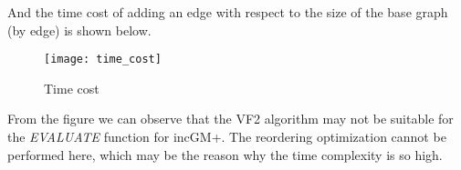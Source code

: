 \documentclass[a4paper, 12pt]{report}
\begin{document}
And the time cost of adding an edge with respect to the size of the base graph (by edge) is shown below.

\begin{figure}[H]
\centering
\texttt{[image: time\_cost]}
\caption{Time cost}
\end{figure}

From the figure we can observe that the VF2 algorithm may not be suitable for the \emph{EVALUATE} function for incGM+. The reordering optimization cannot be performed here, which may be the reason why the time complexity is so high.

{}

\end{document}
